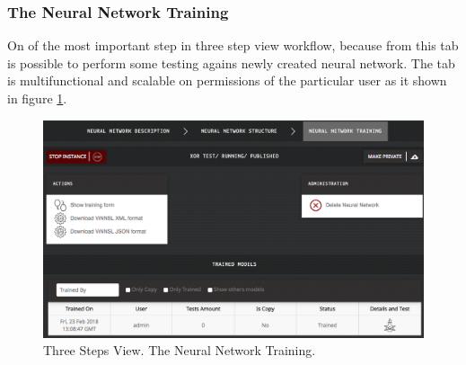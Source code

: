 \subsubsection{The Neural Network Training}

On of the most important step in three step view workflow, because from this tab is possible to perform some testing agains newly created neural network. The tab is multifunctional and scalable on permissions of the particular user as it shown in figure \ref{fig:training_3_steps}.

\begin{figure}[htbp]
\begin{center}
  \includegraphics[width=\linewidth]{components/5/img/training_3_steps.png}
  \caption{Three Steps View. The Neural Network Training.}
  \label{fig:training_3_steps}
\end{center}
\end{figure}


